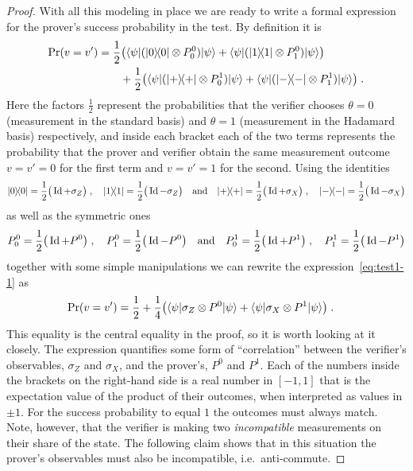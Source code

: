 \begin{proof}
With all this modeling in place we are ready to write a formal expression for the prover's success probability in the test. By definition it is 
\begin{align}
\Pr(v=v') &= \frac{1}{2}\big( \langle{\psi}| (|0\rangle\!\langle0| \otimes P^0_0) |{\psi}\rangle +  \langle{\psi}| (|1\rangle\!\langle1| \otimes P^0_1) |{\psi}\rangle\big)\notag\\
&\qquad  + \frac{1}{2}\big( \langle{\psi}|( |+\rangle\!\langle+| \otimes P^1_0 )|{\psi}\rangle +  \langle{\psi}| (|-\rangle\!\langle-| \otimes P^1_1 )|{\psi}\rangle \big) \;.\label{eq:test1-1}
\end{align}
Here the factors $\frac{1}{2}$ represent the probabilities that the verifier chooses $\theta=0$ (measurement in the standard basis) and $\theta=1$ (measurement in the Hadamard basis) respectively, and inside each bracket each of the two terms represents the probability that the prover and verifier obtain the same measurement outcome $v=v'=0$ for the first term and $v=v'=1$ for the second. 
Using the identities 
\[ |0\rangle\!\langle0| = \frac{1}{2}\big(\mathop{\rm Id}\nolimits+\sigma_Z \big)\;,\quad |1\rangle\!\langle1| = \frac{1}{2}\big(\mathop{\rm Id}\nolimits-\sigma_Z \big) \quad \text{and}\quad|+\rangle\!\langle+| = \frac{1}{2}\big(\mathop{\rm Id}\nolimits+\sigma_X \big)\;,\quad |-\rangle\!\langle-| = \frac{1}{2}\big(\mathop{\rm Id}\nolimits-\sigma_X \big)\]
as well as the symmetric ones 
\[ P^0_0 = \frac{1}{2}\big( \mathop{\rm Id}\nolimits + P^0\big)\;,\quad P^0_1 = \frac{1}{2}\big(\mathop{\rm Id}\nolimits - P^0\big)\quad\text{and}\quad P^1_0 = \frac{1}{2}\big( \mathop{\rm Id}\nolimits + P^1\big)\;, \quad P^1_1 = \frac{1}{2}\big(\mathop{\rm Id}\nolimits - P^1\big)\]
together with some simple manipulations
 we can rewrite the expression~\eqref{eq:test1-1} as 
\begin{align}
\Pr(v=v') &= \frac{1}{2} + \frac{1}{4}\big( \langle{\psi}| \sigma_Z \otimes P^0 |{\psi}\rangle+  \langle{\psi}| \sigma_X \otimes P^1 |{\psi}\rangle \big)\;.\label{eq:qubit-1-a}
\end{align}
This equality is the central equality in the proof, so it is worth looking at it closely. The expression quantifies some form of ``correlation'' between the verifier's observables, $\sigma_Z$ and $\sigma_X$, and the prover's, $P^0$ and $P^1$. Each of the numbers inside the brackets on the right-hand side is a real number in $[-1,1]$ that is the expectation value of the product of their outcomes, when interpreted as values in $\pm 1$. For the success probability to equal $1$ the outcomes must always match. Note, however, that the verifier is making two \emph{incompatible} measurements on their share of the state. The following claim shows that in this situation the prover's observables must also be incompatible, i.e.\ anti-commute. 


\end{proof}
